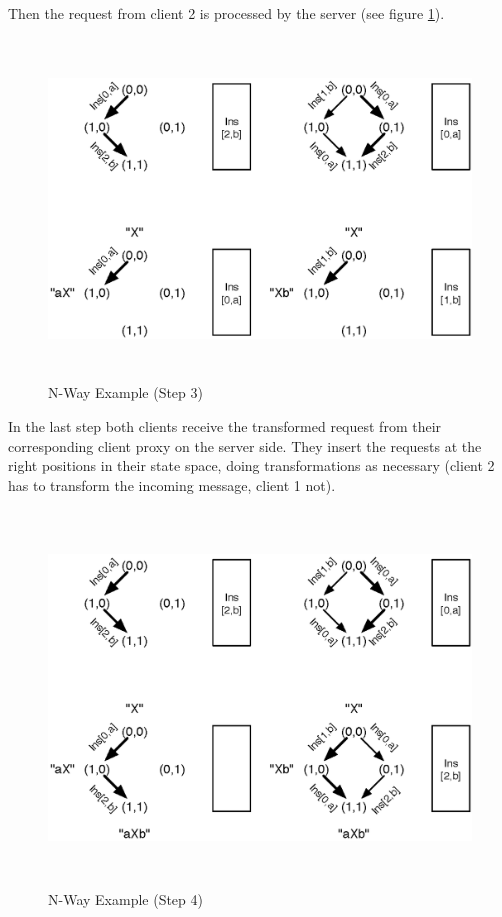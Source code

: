 Then the request from client 2 is processed by the server (see figure \ref{fig:concepts.nway-example-3}). 

\begin{figure}[H]
 \centering
 \includegraphics[width=14.5cm,height=9.03cm]{../../images/concepts_nway-example-3.eps}
 \caption{N-Way Example (Step 3)}
 \label{fig:concepts.nway-example-3}
\end{figure}

In the last step both clients receive the transformed request from their corresponding client proxy on the server side. They insert the requests at the right positions in their state space, doing transformations as necessary (client 2 has to transform the incoming message, client 1 not).

\begin{figure}[H]
 \centering
 \includegraphics[width=14.5cm,height=9.95cm]{../../images/concepts_nway-example-4.eps}
 \caption{N-Way Example (Step 4)}
 \label{fig:concepts.nway-example-4}
\end{figure}



